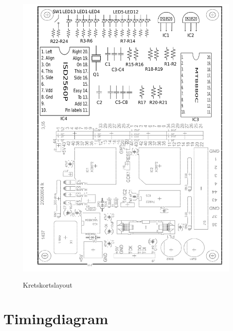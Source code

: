 \documentclass[a4paper,11pt]{article}
\begin{document}
	\begin{figure}[ht!]
	  \centering
	      \includegraphics[scale=0.7, angle=0]{layout.png}
		\label{fig:layout}
	  	\caption{Kretskortslayout}
	\end{figure}
	
	\section{Timingdiagram}
\end{document}
